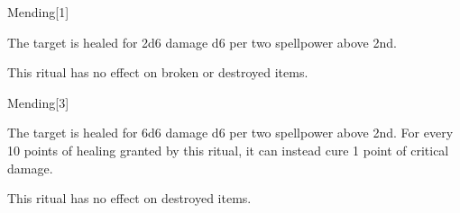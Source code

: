 \begin{spellsection}{Mending}[1]
    \begin{spellheader}
    \end{spellheader}
    \begin{spellcontent}
        \begin{spelltargetinginfo}
        \end{spelltargetinginfo}
        \begin{spelleffects}

            \spelleffect The target is healed for 2d6 damage \add d6 per two spellpower above 2nd.
        \end{spelleffects}
    \end{spellcontent}
    \begin{spellfooter}
        \spellnotes This ritual has no effect on broken or destroyed items.
    \end{spellfooter}
\end{spellsection}

\begin{spellsection}[Greater]{Mending}[3]
    \begin{spellheader}
    \end{spellheader}
    \begin{spellcontent}
        \begin{spelltargetinginfo}
        \end{spelltargetinginfo}
        \begin{spelleffects}

            \spelleffect The target is healed for 6d6 damage \add d6 per two spellpower above 2nd. For every 10 points of healing granted by this ritual, it can instead cure 1 point of critical damage.
        \end{spelleffects}
    \end{spellcontent}
    \begin{spellfooter}
        \spellnotes This ritual has no effect on destroyed items.
    \end{spellfooter}
\end{spellsection}

